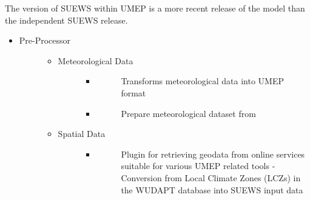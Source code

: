\documentclass[letterpaper,10pt,english]{sphinxmanual}
\begin{document}
The version of SUEWS within UMEP is a more recent release of the model
than the independent SUEWS release.
\begin{itemize}
\item {} \begin{description}
\item[{Pre-Processor}] \leavevmode\begin{itemize}
\item {} \begin{description}
\item[{Meteorological Data}] \leavevmode\begin{itemize}
\item {} \begin{description}
\item[{}] \leavevmode
Transforms meteorological data into UMEP format

\end{description}

\item {} \begin{description}
\item[{}] \leavevmode
Prepare meteorological dataset from {\hyperref[\detokenize{notation:term-watch}]{}}

\end{description}

\end{itemize}

\end{description}

\item {} \begin{description}
\item[{Spatial Data}] \leavevmode\begin{itemize}
\item {} \begin{description}
\item[{}] \leavevmode
Plugin for retrieving geodata from online services suitable for various UMEP related tools
- 
Conversion from Local Climate Zones (LCZs) in the WUDAPT database into SUEWS input data


\end{description}
\end{itemize}
\end{description}
\end{itemize}
\end{description}
\end{itemize}
\end{document}
